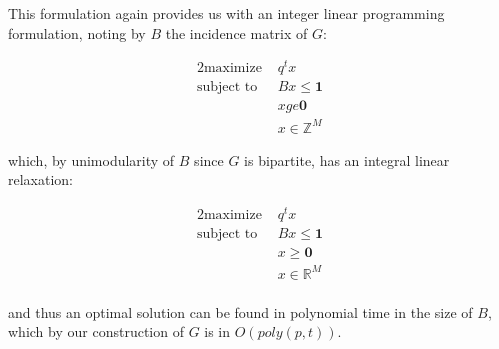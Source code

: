 This formulation again provides us with an integer linear programming formulation, noting by $B$ the incidence matrix of $G$:

\begin{alignat*}{2}
  \text{maximize }   & q^t x \\
  \text{subject to } & Bx \le \mathbf{1}\\
                     & x ge \mathbf{0}\\
                     & x \in \mathbb{Z}^M
\end{alignat*}

which, by unimodularity of $B$ since $G$ is bipartite,  has an integral linear relaxation:

\begin{alignat*}{2}
  \text{maximize }   & q^t x \\
  \text{subject to } & Bx \le \mathbf{1}\\
                     & x \ge \mathbf{0}\\
                     & x \in \mathbb{R}^M\\
\end{alignat*}

and thus an optimal solution can be found in polynomial time in the size of $B$, which by our construction of $G$ is in $O(poly(p, t))$.
